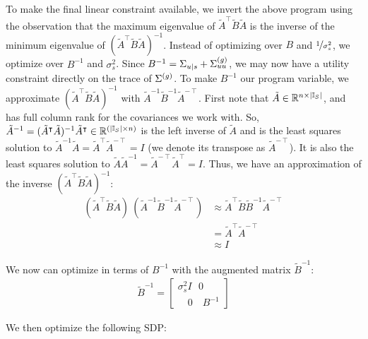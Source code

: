 To make the final linear constraint available, we invert the above program using the observation that the maximum eigenvalue of $\tilde{A}^\intercal \tilde{B} \tilde{A}$ is the inverse of the minimum eigenvalue of $(\tilde{A}^\intercal \tilde{B} \tilde{A})^{-1}$. Instead of optimizing over $B$ and $\nicefrac{1}{\sigma_s^2}$, we optimize over $B^{-1}$ and $\sigma_s^2$. Since $B^{-1} = \Sigma_{u|s} + \Sigma^{(g)}_{uu}$, we may now have a utility constraint directly on the trace of $\Sigma^{(g)}$. To make $B^{-1}$ our program variable, we approximate $(\tilde{A}^\intercal \tilde{B} \tilde{A})^{-1}$ with $\tilde{A}^{-1} \tilde{B}^{-1} \tilde{A}^{-\intercal}$. First note that $\tilde{A} \in {\mathbb R}^{n \times |{\mathbb{I}_S}|}$, and has full column rank for the covariances we work with. So, $\tilde{A}^{-1} = (\tilde{A}^\intercal \tilde{A})^{-1}\tilde{A}^\intercal \in {\mathbb R}^{(|{\mathbb{I}_S}| \times n)}$ is the left inverse of $\tilde{A}$ and is the least squares solution to $\tilde{A}^{-1} \tilde{A} = \tilde{A}^\intercal \tilde{A}^{-\intercal}  = I$ (we denote its transpose as $\tilde{A}^{-\intercal}$). It is also the least squares solution to $\tilde{A} \tilde{A}^{-1} = \tilde{A}^{-\intercal} \tilde{A}^\intercal = I$. Thus, we have an approximation of the inverse $(\tilde{A}^\intercal \tilde{B} \tilde{A})^{-1}$: 
\begin{align*}
	(\tilde{A}^\intercal \tilde{B} \tilde{A}) \ (\tilde{A}^{-1} \tilde{B}^{-1} \tilde{A}^{-\intercal})
	&\approx \tilde{A}^\intercal \tilde{B} \tilde{B}^{-1} \tilde{A}^{-\intercal} \\
	&= \tilde{A}^\intercal \tilde{A}^{-\intercal} \\
	&\approx I
\end{align*}

We now can optimize in terms of $B^{-1}$ with the augmented matrix $\tilde{B}^{-1}$: 
\begin{align*}
	\tilde{B}^{-1} = 
	\begin{bmatrix}
		\sigma_s^2 I \ \ \  0 \\
		\quad 0 \quad  B^{-1}
	\end{bmatrix}
\end{align*}

We then optimize the following SDP: 


